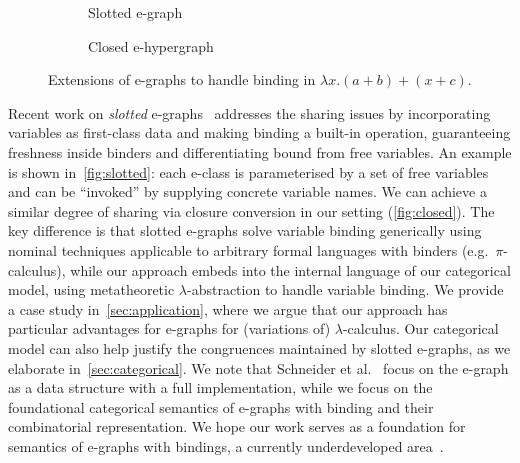 \begin{figure}
	\vspace{-8pt}
	\captionsetup{skip=2pt}
	\begin{subfigure}[b]{0.48\linewidth}
		\centering
		\caption{Slotted e-graph}%
		\label{fig:slotted}
	\end{subfigure}
	\hfill
	\begin{subfigure}[b]{0.48\linewidth}
		\centering
		\caption{Closed e-hypergraph}%
		\label{fig:closed}
	\end{subfigure}
	\caption{Extensions of e-graphs to handle binding in $\lambda x . (a + b) + (x + c)$.}%
	\label{fig:extended-egraphs}
	\vspace{-8pt}
\end{figure}
Recent work on \emph{slotted} e-graphs~\cite{slotted-egraphs} addresses the sharing issues by incorporating variables as first-class data and making binding a built-in operation, guaranteeing freshness inside binders and differentiating bound from free variables.
An example is shown in~\autoref{fig:slotted}: each e-class is parameterised by a set of free variables and can be \enquote{invoked} by supplying concrete variable names. 
We can achieve a similar degree of sharing via closure conversion in our setting (\autoref{fig:closed}).
The key difference is that slotted e-graphs solve variable binding generically using nominal techniques applicable to arbitrary formal languages with binders (e.g.\ $\pi$-calculus), while our approach embeds into the internal language of our categorical model, using metatheoretic $\lambda$-abstraction to handle variable binding.
We provide a case study in~\autoref{sec:application}, where we argue that our approach has particular advantages for e-graphs for (variations of) $\lambda$-calculus.
Our categorical model can also help justify the congruences maintained by slotted e-graphs, as we elaborate in~\autoref{sec:categorical}.
We note that Schneider et al.~\cite{slotted-egraphs} focus on the e-graph as a data structure with a full implementation, while we focus on the foundational categorical semantics of e-graphs with binding and their combinatorial representation.
We hope our work serves as a foundation for semantics of e-graphs with bindings, a currently underdeveloped area~\cite{zhang_relational_2022,tree_automata_e_graphs}.

